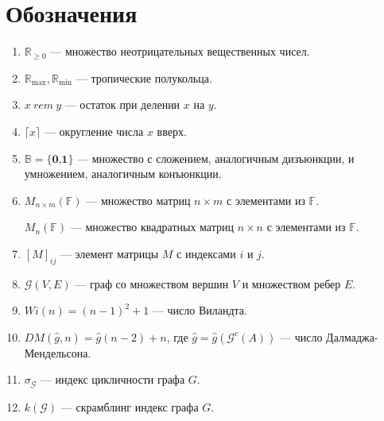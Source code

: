 \documentclass[12pt]{article}
\begin{document}
\section{Обозначения}
\begin{enumerate}
    \item ${\mathbb{R}_{\geq0}}$ --- множество неотрицательных вещественных чисел.
    
    \item $\mathbb{R}_{\max}, \mathbb{R}_{\min}$ --- тропические полукольца.
    
    \item $x \ rem \ y$ --- остаток при делении $x$ на $y$.
    
    \item $\lceil x \rceil$ --- округление числа $x$ вверх.
   
    \item $\mathbb{B} = \{\textbf{0,1}\}$ --- множество с сложением, аналогичным дизъюнкции, и умножением, аналогичным конъюнкции.
    
    \item $M_{n \times m}(\mathbb{F})$ --- множество матриц $n \times m$ с элементами из $\mathbb{F}$.
    
    $M_n(\mathbb{F})$ --- множество квадратных матриц $n \times n$ с элементами из $\mathbb{F}$.
    
    \item $[M]_{ij}$ --- элемент матрицы $M$ с индексами $i$ и $j$.
    
    \item ${\mathcal{G}(V,E)}$ --- граф со множеством вершин $V$ и множеством ребер $E$.
    
    \item $Wi(n) = (n - 1)^2 + 1$ --- число Виландта.
    
    \item $DM(\hat{g}, n) =  \hat{g}(n - 2) + n$, где $\hat{g} = \hat{g}(\mathcal{G}^c(A))$ --- число Далмаджа-Мендельсона.
    

    
    \item $\sigma_\mathcal{G}$ --- индекс цикличности графа $G$.
    
    \item $k(\mathcal{G})$ --- скрамблинг индекс графа $G$.
    

\end{enumerate}
\end{document}

